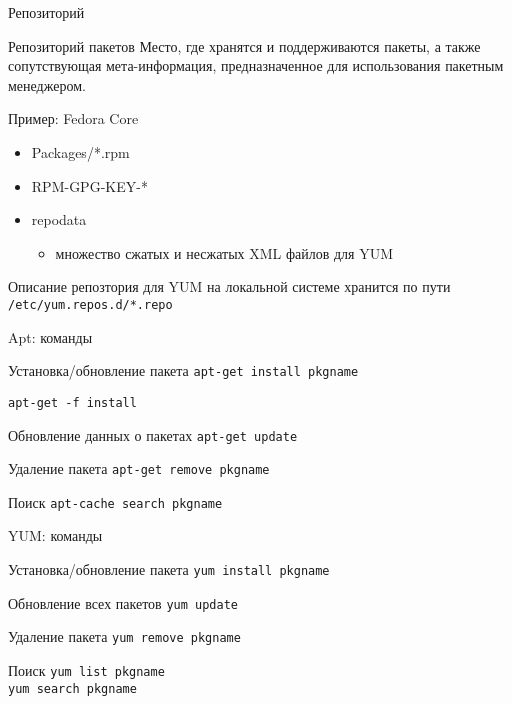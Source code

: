 
\begin{frame}{Репозиторий}
	\begin{block}{Репозиторий пакетов}
		Место, где хранятся и поддерживаются пакеты, а также сопутствующая мета-информация, предназначенное для использования пакетным менеджером.
	\end{block}
	\begin{block}{Пример: Fedora Core}
		\begin{itemize}
			\item Packages/*.rpm
			\item RPM-GPG-KEY-*
			\item repodata
			\begin{itemize}
				\item множество сжатых и несжатых XML файлов для YUM
			\end{itemize}
		\end{itemize}

		Описание репозтория для YUM на локальной системе хранится по пути
		{\tt /etc/yum.repos.d/*.repo}
	\end{block}
		
\end{frame}

\begin{frame}{Apt: команды}
	\begin{block}{Установка/обновление пакета}
		{\tt apt-get install pkgname }

                {\tt apt-get -f install}
	\end{block}
	\begin{block}{Обновление данных о пакетах}
		{\tt apt-get update }
	\end{block}
	\begin{block}{Удаление пакета}
		{\tt apt-get remove pkgname }
	\end{block}
	\begin{block}{Поиск}
		{\tt apt-cache search pkgname }
	\end{block}
\end{frame}

\begin{frame}{YUM: команды}
	\begin{block}{Установка/обновление пакета}
		{\tt yum install pkgname }
	\end{block}
	\begin{block}{Обновление всех пакетов}
		{\tt yum update }
	\end{block}
	\begin{block}{Удаление пакета}
		{\tt yum remove pkgname }
	\end{block}
	\begin{block}{Поиск}
		{\tt yum list pkgname }\\
		{\tt yum search pkgname }
	\end{block}
\end{frame}


